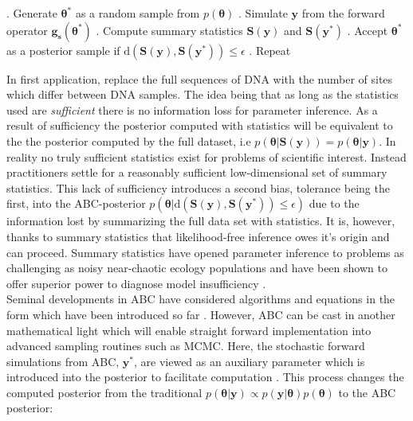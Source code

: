 \begin{algorithm}[H]
	\caption{ }
	\begin{algorithmic}
		. Generate $\bm{\theta^*}$ as a random sample from $p(\bm{\theta})$		
		. Simulate $\bm{y}$ from the forward operator $\bm{g_s}(\bm{\theta^*})$		
		. Compute summary statistics $\bm{S}(\bm{y})$ and $\bm{S}(\bm{y^*})$		
		. Accept $\bm{\theta^*}$ as a posterior sample if $\text{d}(\bm{S}(\bm{y}),\bm{S}(\bm{y^*}))\leq\epsilon$		
		. Repeat
	\end{algorithmic}
	\label{ABCrejectionsampler}
\end{algorithm}

In first application, \citet{Tavare1997} replace the full sequences of DNA with the number of sites which differ between DNA samples. The idea being that as long as the statistics used are \textit{sufficient} there is no information loss for parameter inference. As a result of sufficiency the posterior computed with statistics will be equivalent to the the posterior computed by the full dataset, i.e $p(\bm{\theta}|\bm{S}(\bm{y})) = p(\bm{\theta}|\bm{y})$. In reality no truly sufficient statistics exist for problems of scientific interest. Instead practitioners settle for a reasonably sufficient low-dimensional set of summary statistics. This lack of sufficiency introduces a second bias, tolerance being the first, into the ABC-posterior $p(\bm{\theta}|\text{d}(\bm{S}(\bm{y}),\bm{S}(\bm{y^*}))\leq\epsilon)$ due to the information lost by summarizing the full data set with statistics. It is, however, thanks to summary statistics that likelihood-free inference owes it's origin and can proceed. Summary statistics have opened parameter inference to problems as challenging as noisy near-chaotic ecology populations \citep{Wood2010} and have been shown to offer superior power to diagnose model insufficiency \citep{Ratmann2009,vrugt2013toward}.\\

Seminal developments in ABC have considered algorithms and equations in the form which have been introduced so far \citep{Fu1997,Pritchard1999a,Beaumont2002,Marjoram2003}. However, ABC can be cast in another mathematical light which will enable straight forward implementation into advanced sampling routines such as MCMC. Here, the stochastic forward simulations from ABC, $\bm{y^*}$, are viewed as an auxiliary parameter which is introduced into the posterior to facilitate computation \citep{Sisson2010a}. This process changes the computed posterior from the traditional $p(\bm{\theta}|\bm{y}) \propto p(\bm{y}|\bm{\theta})p(\bm{\theta})$ to the ABC posterior:

